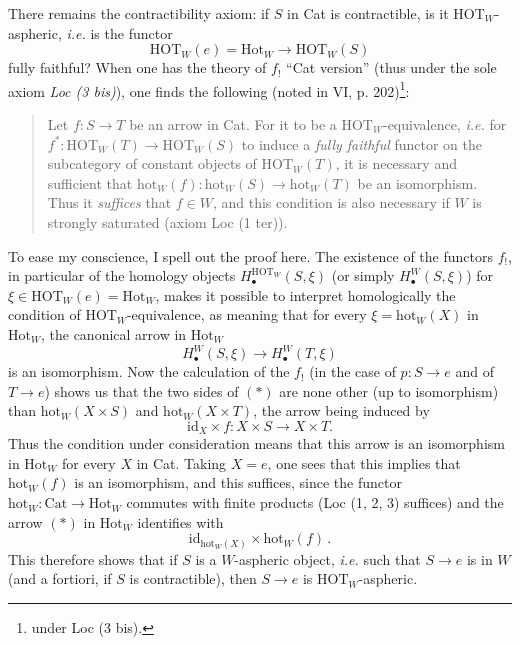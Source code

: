 \documentclass[11pt]{article}
\newcommand{\printedpage}[1]{\marginpar{\footnotesize p.~#1}}
\newcommand{\msp}[1]{\marginpar{\footnotesize [#1]}}
\begin{document}
\msp{page 111}
There remains the contractibility axiom: if $S$ in Cat is contractible, is it $\mathrm{HOT}_W$-aspheric, \textit{i.e.} is the functor
\[
\mathrm{HOT}_W(e) = \mathrm{Hot}_W \longrightarrow \mathrm{HOT}_W(S)
\]
\printedpage{53}
fully faithful? When one has the theory of $f_!$ ``Cat version'' (thus under the sole axiom \textit{Loc (3 bis)}), one finds the following (noted in VI, p. 202)\footnote[52]{under Loc (3 bis).}:
\begin{quote}
Let $f : S \longrightarrow T$ be an arrow in Cat. For it to be a $\mathrm{HOT}_W$-equivalence, \textit{i.e.} for $f^* : \mathrm{HOT}_W(T) \longrightarrow \mathrm{HOT}_W(S)$ to induce a \textit{fully faithful} functor on the subcategory of constant objects of $\mathrm{HOT}_W(T)$, it is necessary and sufficient that $\mathrm{hot}_W(f) : \mathrm{hot}_W(S) \longrightarrow \mathrm{hot}_W(T)$ be an isomorphism. Thus it \textit{suffices} that $f \in W$, and this condition is also necessary if $W$ is strongly saturated (axiom Loc (1 ter)).
\end{quote}
To ease my conscience, I spell out the proof here. The existence of the functors
\msp{page 112}
$f_!$, in particular of the homology objects $H_\bullet^{\mathrm{HOT}_W}(S,\xi)$ (or simply $H_\bullet^W(S,\xi)$) for $\xi \in \mathrm{HOT}_W(e) = \mathrm{Hot}_W$, makes it possible to interpret homologically the condition of $\mathrm{HOT}_W$-equivalence, as meaning that for every $\xi = \mathrm{hot}_W(X)$ in $\mathrm{Hot}_W$, the canonical arrow in $\mathrm{Hot}_W$ %
\[
H_\bullet^W(S,\xi) \longrightarrow H_\bullet^W(T,\xi) \tag*{$(*)$}
\]
is an isomorphism. Now the calculation of the $f_!$ (in the case of $p : S \longrightarrow e$ and of $T \longrightarrow e$) shows us that the two sides of $(*)$ are none other (up to isomorphism) than $\mathrm{hot}_W(X \times S)$ and $\mathrm{hot}_W(X \times T)$, the arrow being induced by
\[
\mathrm{id}_X \times f : X \times S \longrightarrow X \times T. \tag*{$(*)$}
\]
Thus the condition under consideration means that this arrow is an isomorphism in $\mathrm{Hot}_W$ for every $X$ in Cat. Taking $X = e$, one sees that this implies that $\mathrm{hot}_W(f)$ is an isomorphism, and this suffices, since the
\msp{page 113}
functor $\mathrm{hot}_W : \mathrm{Cat} \longrightarrow \mathrm{Hot}_W$ commutes with finite products (Loc (1, 2, 3) suffices) and the arrow $(*)$ in $\mathrm{Hot}_W$ identifies with
\[
\mathrm{id}_{\mathrm{hot}_W(X)} \times \mathrm{hot}_W(f)\,.
\]
This therefore shows that if $S$ is a $W$-aspheric object, \textit{i.e.} such that $S \longrightarrow e$ is in $W$ (and a fortiori, if $S$ is contractible), then $S \longrightarrow e$ is $\mathrm{HOT}_W$-aspheric.
\end{document}
